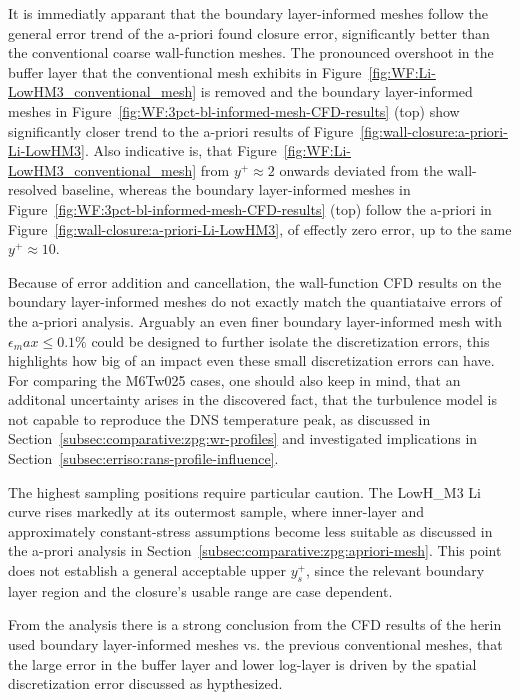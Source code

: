 It is immediatly apparant that the boundary layer-informed meshes follow the general error trend of the a-priori found closure error, significantly better than the conventional coarse wall-function meshes. The pronounced overshoot in the buffer layer that the conventional mesh exhibits in Figure~\ref{fig:WF:Li-LowHM3_conventional_mesh} is removed and the boundary layer-informed meshes in Figure~\ref{fig:WF:3pct-bl-informed-mesh-CFD-results} (top) show significantly closer trend to the a-priori results of Figure~\ref{fig:wall-closure:a-priori-Li-LowHM3}. Also indicative is, that Figure~\ref{fig:WF:Li-LowHM3_conventional_mesh} from $y^+\approx2$ onwards deviated from the wall-resolved baseline, whereas the boundary layer-informed meshes in Figure~\ref{fig:WF:3pct-bl-informed-mesh-CFD-results} (top) follow the a-priori in Figure~\ref{fig:wall-closure:a-priori-Li-LowHM3}, of effectly zero error, up to the same $y^+\approx10$.
\par\medskip

Because of error addition and cancellation, the wall-function CFD results on the boundary layer-informed meshes do not exactly match the quantiataive errors of the a-priori analysis. Arguably an even finer boundary layer-informed mesh with $\epsilon_max \le 0.1\%$ could be designed to further isolate the discretization errors, this highlights how big of an impact even these small discretization errors can have. For comparing the M6Tw025 cases, one should also keep in mind, that an additonal uncertainty arises in the discovered fact, that the turbulence model is not capable to reproduce the DNS temperature peak, as discussed in Section~\ref{subsec:comparative:zpg:wr-profiles} and investigated implications in Section~\ref{subsec:erriso:rans-profile-influence}.
\par\medskip

The highest sampling positions require particular caution. The LowH\_M3 Li curve rises markedly at its outermost sample, where inner-layer and approximately constant-stress assumptions become less suitable as discussed in the a-prori analysis in Section~\ref{subsec:comparative:zpg:apriori-mesh}. This point does not establish a general acceptable upper $y_s^+$, since the relevant boundary layer region and the closure's usable range are case dependent.
\par\medskip

From the analysis there is a strong conclusion from the CFD results of the herin used boundary layer-informed meshes vs. the previous conventional meshes, that the large error in the buffer layer and lower log-layer is driven by the spatial discretization error discussed as hypthesized.

